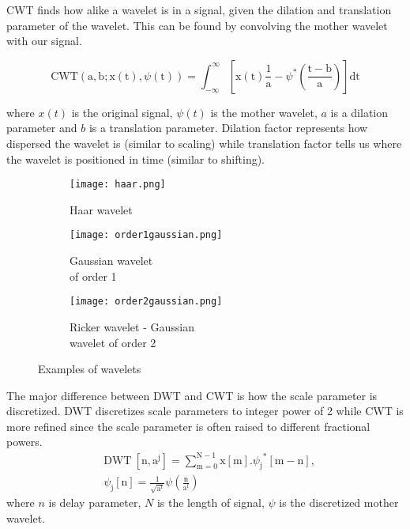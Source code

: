 \begin{enumerate}
	CWT finds how alike a wavelet is in a signal, given the dilation and translation parameter of the wavelet. 
	This can be found by convolving the mother wavelet with our signal.

	\begin{equation*} 
		\text{CWT}(\mathrm{a},\mathrm{b}; \mathrm{x}(\mathrm{t}),\psi(\mathrm{t}))=\int_{-\infty}^{\infty}[\mathrm{x}(\mathrm{t})\frac{1}{\mathrm{a}}-\psi^{*}(\frac{\mathrm{t}-\mathrm{b}}{\mathrm{a}})]\text{dt}
	\end{equation*}

	where $x(t)$ is the original signal, $\psi(t)$ is the mother wavelet, $a$ is a dilation parameter and $b$ is a translation parameter.
	Dilation factor represents how dispersed the wavelet is (similar to scaling) while translation factor tells us where the wavelet is
	positioned in time (similar to shifting). 
	
	\begin{figure}
		\centering
		\begin{subfigure}{.4\textwidth}
		  \centering
		  \texttt{[image: haar.png]}
		  \caption{Haar wavelet}
		  \label{Haar}
		\end{subfigure}
		\hfill
		\begin{subfigure}{.4\textwidth}
			\centering
			\texttt{[image: order1gaussian.png]}
			\caption{Gaussian wavelet \\of order 1}
			\label{order1}
		\end{subfigure}
		\hfill
		\begin{subfigure}{.4\textwidth}
		  \centering
		  \texttt{[image: order2gaussian.png]}
		  \caption{Ricker wavelet - Gaussian \\wavelet of order 2}
		  \label{Ricker}
		\end{subfigure}

		\caption{Examples of wavelets}
		\label{fig:test}
	\end{figure}
	
	The major difference between DWT and CWT is how the scale parameter is discretized. DWT discretizes scale parameters to integer power of 2 while CWT is more refined since 
	the scale parameter is often raised to different fractional powers.
	\begin{align*} &\text{DWT}\ [\mathrm{n},\mathrm{a}^{\mathrm{j}}]=\sum_{\mathrm{m}=0}^{\mathrm{N}-1}\mathrm{x}[\mathrm{m}].{\psi_{\mathrm{j}}}^{*}[\mathrm{m}-\mathrm{n}],\\ &\psi_{\mathrm{j}}[\mathrm{n}]=\frac{1}{\sqrt{\mathrm{a}^{\mathrm{f}}}}\psi\left(\frac{\mathrm{n}}{\mathrm{a}^{\mathrm{f}}}\right) \tag{2} \end{align*}
	where $n$ is delay parameter, $N$ is the length of signal, $\psi$ is the discretized mother wavelet. 


\end{enumerate}
